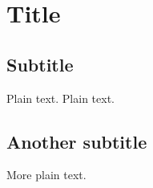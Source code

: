 \documentclass{article}
\begin{document}
\section{Title}

\subsection{Subtitle}

Plain text. Plain text.

\subsection{Another subtitle}

More plain text.
\end{document}
